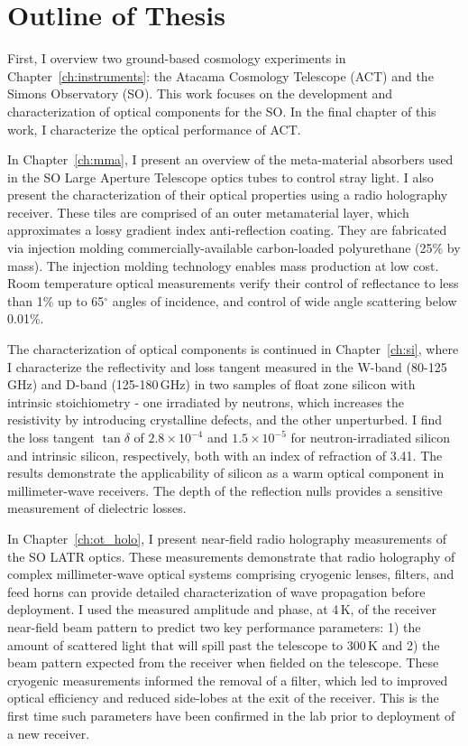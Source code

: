 \section{Outline of Thesis}

First, I overview two ground-based cosmology experiments in Chapter~\ref{ch:instruments}: the Atacama Cosmology Telescope (ACT) and the Simons Observatory (SO).  This work focuses on the development and characterization of optical components for the SO.  In the final chapter of this work, I characterize the optical performance of ACT.

In Chapter~\ref{ch:mma}, I present an overview of the meta-material absorbers used in the SO Large Aperture Telescope optics tubes to control stray light.  I also present the characterization of their optical properties using a radio holography receiver.  These tiles are comprised of an outer metamaterial layer, which approximates a lossy gradient index anti-reflection coating. They are fabricated via injection molding commercially-available carbon-loaded polyurethane (25\% by mass). The injection molding technology enables mass production at low cost.  Room temperature optical measurements verify their control of reflectance to less than 1\% up to 65$^{\circ}$ angles of incidence, and control of wide angle scattering below 0.01\%.

The characterization of optical components is continued in Chapter~\ref{ch:si}, where I characterize the reflectivity and loss tangent measured in the W-band (80-125\,GHz) and D-band (125-180\,GHz) in two samples of float zone silicon with intrinsic stoichiometry - one irradiated by neutrons, which increases the resistivity by introducing crystalline defects, and the other unperturbed.  I find the loss tangent $\tan\delta$ of $2.8\times10^{-4}$ and $1.5\times10^{-5}$ for neutron-irradiated silicon and intrinsic silicon, respectively, both with an index of refraction of 3.41.  The results demonstrate the applicability of silicon as a warm optical component in millimeter-wave receivers.  The depth of the reflection nulls provides a sensitive measurement of dielectric losses.

In Chapter~\ref{ch:ot_holo}, I present near-field radio holography measurements of the SO LATR optics.  These measurements demonstrate that radio holography of complex millimeter-wave optical systems comprising cryogenic lenses, filters, and feed horns can provide detailed characterization of wave propagation before deployment.  I used the measured amplitude and phase, at 4\,K, of the receiver near-field beam pattern to predict two key performance parameters: 1) the amount of scattered light that will spill past the telescope to 300\,K and 2) the beam pattern expected from the receiver when fielded on the telescope.  These cryogenic measurements informed the removal of a filter, which led to improved optical efficiency and reduced side-lobes at the exit of the receiver.  This is the first time such parameters have been confirmed in the lab prior to deployment of a new receiver.

